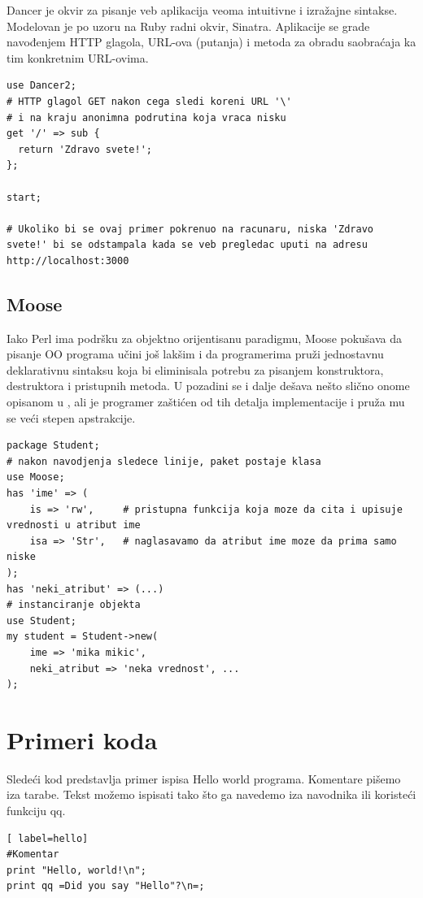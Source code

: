 \documentclass[a4paper]{article}
\begin{document}
Dancer je okvir za pisanje veb aplikacija veoma intuitivne i izražajne sintakse. Modelovan je po uzoru na Ruby radni okvir, Sinatra. Aplikacije se grade navođenjem HTTP glagola, URL-ova (putanja) i metoda za obradu saobraćaja ka tim konkretnim URL-ovima. 

\begin{lstlisting}[label = dancer]
use Dancer2;
# HTTP glagol GET nakon cega sledi koreni URL '\'
# i na kraju anonimna podrutina koja vraca nisku
get '/' => sub { 
  return 'Zdravo svete!';
};
 
start;

# Ukoliko bi se ovaj primer pokrenuo na racunaru, niska 'Zdravo svete!' bi se odstampala kada se veb pregledac uputi na adresu http://localhost:3000 

\end{lstlisting}

\subsection{Moose}

Iako Perl ima podršku za objektno orijentisanu paradigmu, Moose pokušava da pisanje OO programa učini još lakšim i da programerima pruži jednostavnu deklarativnu sintaksu koja bi eliminisala potrebu za pisanjem konstruktora, destruktora i pristupnih metoda. U pozadini se i dalje dešava nešto slično onome opisanom u \href{sec:osobine}, ali je programer zaštićen od tih detalja implementacije i pruža mu se veći stepen apstrakcije.

\begin{lstlisting}[label = moose]
package Student;
# nakon navodjenja sledece linije, paket postaje klasa
use Moose;
has 'ime' => (
    is => 'rw',     # pristupna funkcija koja moze da cita i upisuje vrednosti u atribut ime
    isa => 'Str',   # naglasavamo da atribut ime moze da prima samo niske
);
has 'neki_atribut' => (...)
# instanciranje objekta
use Student;
my student = Student->new(
    ime => 'mika mikic',
    neki_atribut => 'neka vrednost', ...
);
\end{lstlisting}

\section{Primeri koda}
\label{sec:primeri}

Sledeći kod predstavlja primer ispisa Hello world programa. Komentare pišemo iza tarabe. Tekst možemo ispisati tako što ga navedemo iza navodnika ili koristeći funkciju qq.
\begin{lstlisting}[ label=hello]
#Komentar
print "Hello, world!\n";
print qq =Did you say "Hello"?\n=;
\end{lstlisting}
\end{document}
